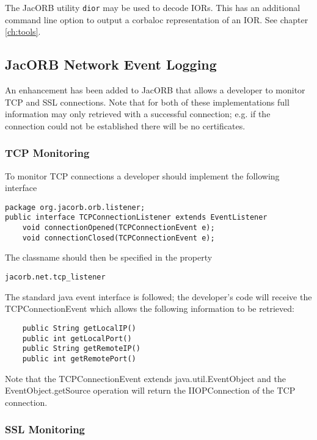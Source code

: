{{The JacORB utility {\tt dior} may be used to decode IORs. This has an additional command line option to output a corbaloc representation of an IOR. See chapter \ref{ch:tools}.

\subsection{JacORB Network Event Logging}
\label{eventLogging}

An enhancement has been added to JacORB that allows a developer to monitor TCP and SSL connections.
Note that for both of these implementations full information may only retrieved with a successful connection;
e.g. if the connection could not be established there will be no certificates.

\subsubsection{TCP Monitoring}

To monitor TCP connections a developer should implement the following interface
\begin{small}
\begin{verbatim}
package org.jacorb.orb.listener;
public interface TCPConnectionListener extends EventListener
    void connectionOpened(TCPConnectionEvent e);
    void connectionClosed(TCPConnectionEvent e);
\end{verbatim}
\end{small}
The classname should then be specified in the property
\begin{verbatim}
jacorb.net.tcp_listener
\end{verbatim}

The standard java event interface is followed; the developer's code will receive the
TCPConnectionEvent which allows the following information to be retrieved:
\begin{small}
\begin{verbatim}
    public String getLocalIP()
    public int getLocalPort()
    public String getRemoteIP()
    public int getRemotePort()
\end{verbatim}
\end{small}
Note that the TCPConnectionEvent extends java.util.EventObject and the EventObject.getSource
operation will return the IIOPConnection of the TCP connection.

\subsubsection{SSL Monitoring}

}}
